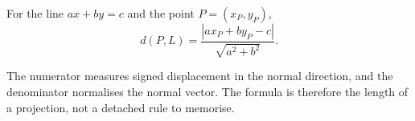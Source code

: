\begin{theorembox}
For the line $ax+by=c$ and the point $P=(x_P,y_P)$,
\[
\boxed{
d(P,L)
=
\frac{|ax_P+by_P-c|}{\sqrt{a^2+b^2}}
}.
\]
\end{theorembox}

\begin{interpretationbox}
The numerator measures signed displacement in the normal direction, and the
denominator normalises the normal vector. The formula is therefore the length
of a projection, not a detached rule to memorise.
\end{interpretationbox}
